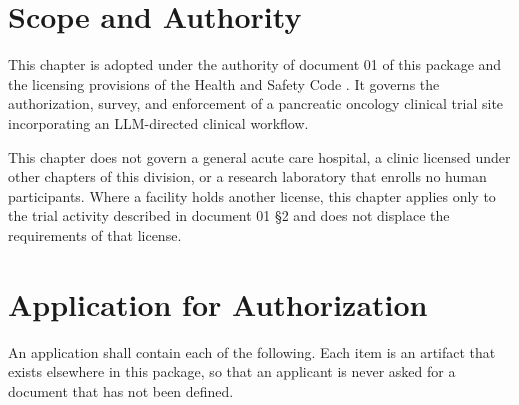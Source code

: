 
\section{Scope and Authority}

This chapter is adopted under the authority of document 01 of this package and
the licensing provisions of the Health and Safety Code \cite{cahsc,ccr22}. It
governs the authorization, survey, and enforcement of a pancreatic oncology
clinical trial site incorporating an LLM-directed clinical workflow.

This chapter does not govern a general acute care hospital, a clinic licensed
under other chapters of this division, or a research laboratory that enrolls no
human participants. Where a facility holds another license, this chapter applies
only to the trial activity described in document 01 §2 and does not displace the
requirements of that license.

\section{Application for Authorization}

An application shall contain each of the following. Each item is an artifact
that exists elsewhere in this package, so that an applicant is never asked for a
document that has not been defined.

